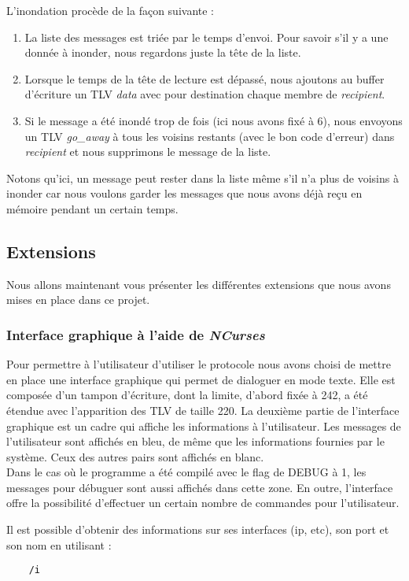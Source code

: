 \documentclass{FR16}
\begin{document}
L'inondation procède de la façon suivante :
\begin{enumerate}
    \item La liste des messages est triée par le temps d'envoi. Pour savoir s'il y a une donnée à inonder, nous regardons juste la tête de la liste.\\
    \item Lorsque le temps de la tête de lecture est dépassé, nous ajoutons au buffer d'écriture un TLV \textit{data} avec pour destination chaque membre de \textit{recipient}.\\
    \item Si le message a été inondé trop de fois (ici nous avons fixé à 6), nous envoyons un TLV \textit{go\_away} à tous les voisins restants (avec le bon code d'erreur) dans \textit{recipient} et nous supprimons le message de la liste.
\end{enumerate}
Notons qu'ici, un message peut rester dans la liste même s'il n'a plus de voisins à inonder car nous voulons garder les messages que nous avons déjà reçu en mémoire pendant un certain temps.

\subsection{Extensions}
Nous allons maintenant vous présenter les différentes extensions que nous avons mises en place dans ce projet.

\subsubsection{Interface graphique à l'aide de \textit{NCurses}}
Pour permettre à l'utilisateur d'utiliser le protocole nous avons choisi de mettre en place une interface graphique qui permet de dialoguer en mode texte. Elle est composée d'un tampon d'écriture, dont la limite, d'abord fixée à 242, a été étendue avec l'apparition des TLV de taille 220. La deuxième partie de l'interface graphique est un cadre qui affiche les informations à l'utilisateur. Les messages de l'utilisateur sont affichés en bleu, de même que les informations fournies par le système. Ceux des autres pairs sont affichés en blanc. \\
Dans le cas où le programme a été compilé avec le flag de DEBUG à 1, les messages pour débuguer sont aussi affichés dans cette zone. En outre, l'interface offre la possibilité d'effectuer un certain nombre de commandes pour l'utilisateur.

Il est possible d'obtenir des informations sur ses interfaces (ip, etc), son port et son nom en utilisant :
\begin{verbatim}
    /i 
\end{verbatim}
\end{document}
